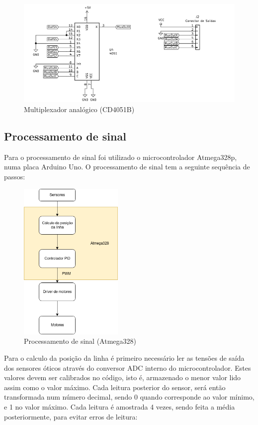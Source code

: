 \documentclass[]{report}
\begin{document}
\begin{figure}[!htb]
	\centering
	\includegraphics[width=14cm]{imagens/mux}
	\caption{Multiplexador analógico (CD4051B)}
\end{figure}

\pagebreak

\subsection*{Processamento de sinal}
Para o processamento de sinal foi utilizado o microcontrolador Atmega328p, numa placa Arduino Uno.
O processamento de sinal tem a seguinte sequência de passos:


\begin{figure}[!htb]
	\centering
	\includegraphics[width=5cm]{imagens/atmega_flow}
	\caption{Processamento de sinal (Atmega328)}
\end{figure}

Para o calculo da posição da linha é primeiro necessário ler as tensões de saída dos sensores óticos através do conversor ADC interno do microcontrolador. Estes valores devem ser calibrados no código, isto é, armazenado o menor valor lido assim como o valor máximo. Cada leitura posterior do sensor, será então transformada num número decimal, sendo 0 quando corresponde ao valor mínimo, e 1 no valor máximo. Cada leitura é amostrada 4 vezes, sendo feita a média posteriormente, para evitar erros de leitura:
\end{document}
